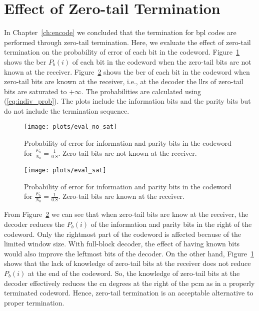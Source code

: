 \section{Effect of Zero-tail Termination}
In Chapter~\ref{ch:encode} we concluded that the termination for \gls{bpl} codes are performed through zero-tail termination. Here, we evaluate the effect of zero-tail termination on the probability of error of each bit in the codeword. Figure~\ref{fig:eval_no_sat} shows the \gls{ber} $P_b(i)$ of each bit in the codeword when the zero-tail bits are not known at the receiver. Figure~\ref{fig:eval_sat} shows the \gls{ber} of each bit in the codeword when zero-tail bits are known at the receiver, i.e., at the decoder the \glspl{llr} of zero-tail bits are saturated to $+\infty$. The probabilities are calculated using (\ref{eq:indiv_prob}).  The plots include the information bits and the parity bits but do not include the termination sequence.
\begin{figure}[htbp]
  \centering
  \texttt{[image: plots/eval\_no\_sat]}
  \caption[$P_b(i)$ when zero-tail bits are not known at receiver.]{Probability of error for information and parity bits in the codeword for $\frac{E_b}{N_0}=\frac{1}{0.8}$. Zero-tail bits are not known at the receiver.}
  \label{fig:eval_no_sat}
\end{figure}

\begin{figure}[htbp]
  \centering
  \texttt{[image: plots/eval\_sat]}
  \caption[$P_b(i)$ when zero-tail bits are known at receiver.]{Probability of error for information and parity bits in the codeword for $\frac{E_b}{N_0}=\frac{1}{0.8}$. Zero-tail bits are known at the receiver.}
  \label{fig:eval_sat}
\end{figure}
 
From Figure~\ref{fig:eval_sat} we can see that when zero-tail bits are know at the receiver, the decoder reduces the $P_b(i)$ of the information and parity bits in the right of the codeword. Only the rightmost part of the codeword is affected because of the limited window size. With full-block decoder, the effect of having known bits would also improve the leftmost bits of the decoder. On the other hand, Figure~\ref{fig:eval_no_sat} shows that the lack of knowledge of zero-tail bits at the receiver does not reduce $P_b(i)$ at the end of the codeword. So, the knowledge of zero-tail bits at the decoder effectively reduces the \gls{cn} degrees at the right of the \gls{pcm} as in a properly terminated codeword. Hence, zero-tail termination is an acceptable alternative to proper termination.
 
